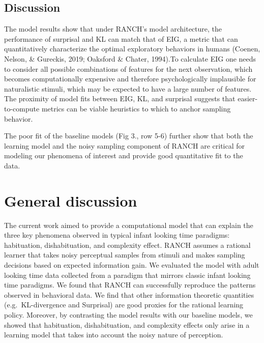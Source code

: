 \documentclass[10pt, letterpaper]{article}
\begin{document}
\hypertarget{discussion}{%
\subsection{Discussion}\label{discussion}}

The model results show that under RANCH's model architecture, the
performance of surprisal and KL can match that of EIG, a metric that can
quantitatively characterize the optimal exploratory behaviors in humans
(Coenen, Nelson, \& Gureckis, 2019; Oaksford \& Chater, 1994).To
calculate EIG one needs to consider all possible combinations of
features for the next observation, which becomes computationally
expensive and therefore psychologically implausible for naturalistic
stimuli, which may be expected to have a large number of features. The
proximity of model fits between EIG, KL, and surprisal suggests that
easier-to-compute metrics can be viable heuristics to which to anchor
sampling behavior.

The poor fit of the baseline models (Fig 3., row 5-6) further show that
both the learning model and the noisy sampling component of RANCH are
critical for modeling our phenomena of interest and provide good
quantitative fit to the data.

\hypertarget{general-discussion}{%
\section{General discussion}\label{general-discussion}}

The current work aimed to provide a computational model that can explain
the three key phenomena observed in typical infant looking time
paradigms: habituation, dishabituation, and complexity effect. RANCH
assumes a rational learner that takes noisy perceptual samples from
stimuli and makes sampling decisions based on expected information gain.
We evaluated the model with adult looking time data collected from a
paradigm that mirrors classic infant looking time paradigms. We found
that RANCH can successfully reproduce the patterns observed in
behavioral data. We find that other information theoretic quantities
(e.g.~KL-divergence and Surprisal) are good proxies for the rational
learning policy. Moreover, by contrasting the model results with our
baseline models, we showed that habituation, dishabituation, and
complexity effects only arise in a learning model that takes into
account the noisy nature of perception.
\end{document}
